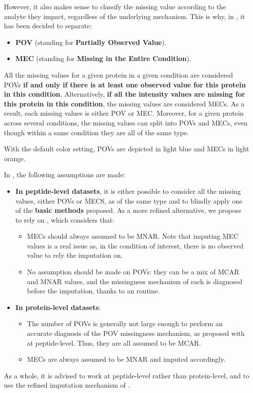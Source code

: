 \documentclass[12pt]{article}
\begin{document}
However, it also makes sense to classify the missing value according to the analyte they impact, regardless of
the underlying mechanism. This is why, in , it has been decided to separate:
\begin{itemize}
	\item \textbf{POV} (standing for \textbf{Partially Observed Value}).
	\item \textbf{MEC} (standing for \textbf{Missing in the Entire Condition}).
\end{itemize}
All the missing values for a given protein in a given condition are considered POVs \textbf{if and only if there is at least one observed value for this protein in this condition}. Alternatively, \textbf{if all the intensity values are missing for this protein in this condition}, the missing values are considered MECs.
As a result, each missing values is either POV or MEC. Moreover, for a given protein across several conditions, the missing values can split into POVs and MECs, even though within a same condition they are all of the same type.

With the default color setting, POVs are depicted in light blue and MECs in light orange.

In , the following assumptions are made:
\begin{itemize}
	\item \textbf{In peptide-level datasets}, it is either possible to consider all the missing values, either POVs or MECS, as of the same type and to blindly apply one of the \textbf{basic methods} proposed. As a more refined alternative, we propose to rely on , which considers that:
	\begin{itemize}
		\item MECs should always assumed to be MNAR. Note that imputing MEC values is a real issue as, in the condition of interest, there is no observed value to rely the imputation on.
		\item No assumption should be made on POVs: they can be a mix of MCAR and MNAR values, and the missingness mechanism of each is diagnosed before the imputation, thanks to an  routine.
	\end{itemize}
		\item \textbf{In protein-level datasets}:
	\begin{itemize}
		\item The number of POVs is generally not large enough to perform an accurate diagnosis of the POV missingness mechanism, as proposed with  at peptide-level. Thus, they are all assumed to be MCAR. 
		\item MECs are always assumed to be MNAR and imputed accordingly. 
	\end{itemize}
\end{itemize}
As a whole, it is advised to work at peptide-level rather than protein-level, and to use the refined imputation mechanism of .
\end{document}
